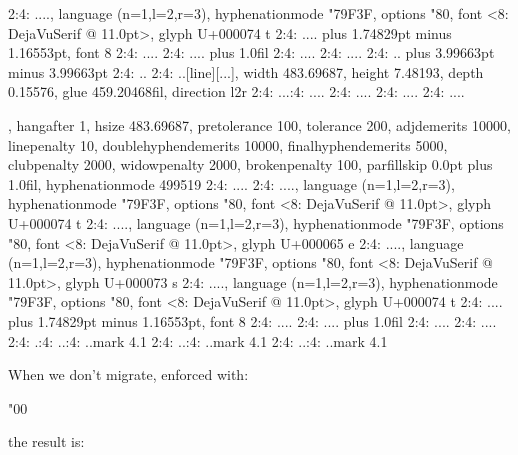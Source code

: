 2:4: ....\glyph[32768][...], language (n=1,l=2,r=3), hyphenationmode "79F3F, options "80, font <8: DejaVuSerif @ 11.0pt>, glyph U+000074 t
2:4: ....\glue[space][...] 3.49658pt plus 1.74829pt minus 1.16553pt, font 8
2:4: ....
2:4: ....\glue[parfill][...] 0.0pt plus 1.0fil
2:4: ....\glue[right][...] 0.0pt
2:4: ....
2:4: ..\glue[par][...] 11.98988pt plus 3.99663pt minus 3.99663pt
2:4: ..\glue[baseline][...] 8.34883pt
2:4: ..\hbox[line][...], width 483.69687, height 7.48193, depth 0.15576, glue 459.20468fil, direction l2r
2:4: ...:4: ....
2:4: ....\glue[left][...] 0.0pt
2:4: ....\glue[parfillleft][...] 0.0pt
2:4: ....\par[newgraf][...], hangafter 1, hsize 483.69687, pretolerance 100, tolerance 200, adjdemerits 10000, linepenalty 10, doublehyphendemerits 10000, finalhyphendemerits 5000, clubpenalty 2000, widowpenalty 2000, brokenpenalty 100, parfillskip 0.0pt plus 1.0fil, hyphenationmode 499519
2:4: ....\glue[indent][...] 0.0pt
2:4: ....\glyph[32768][...], language (n=1,l=2,r=3), hyphenationmode "79F3F, options "80, font <8: DejaVuSerif @ 11.0pt>, glyph U+000074 t
2:4: ....\glyph[32768][...], language (n=1,l=2,r=3), hyphenationmode "79F3F, options "80, font <8: DejaVuSerif @ 11.0pt>, glyph U+000065 e
2:4: ....\glyph[32768][...], language (n=1,l=2,r=3), hyphenationmode "79F3F, options "80, font <8: DejaVuSerif @ 11.0pt>, glyph U+000073 s
2:4: ....\glyph[32768][...], language (n=1,l=2,r=3), hyphenationmode "79F3F, options "80, font <8: DejaVuSerif @ 11.0pt>, glyph U+000074 t
2:4: ....\glue[space][...] 3.49658pt plus 1.74829pt minus 1.16553pt, font 8
2:4: ....
2:4: ....\glue[parfill][...] 0.0pt plus 1.0fil
2:4: ....\glue[right][...] 0.0pt
2:4: ....
2:4: .:4: ..:4: ..{mark 4.1}
2:4: ..:4: ..{mark 4.1}
2:4: ..:4: ..{mark 4.1}
\stoptyping
\stop

When we don't migrate, enforced with:

\starttyping[option=TEX]
\automigrationmode"00 
\stoptyping

the result is:

